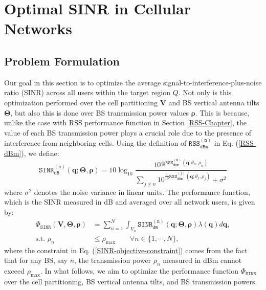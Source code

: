 \section{Optimal SINR in Cellular Networks}\label{SINR-Chapter}


\subsection{Problem Formulation}\label{SINR-Problem-Formulation}

Our goal in this section is to optimize the average signal-to-interference-plus-noise ratio (SINR) across all users within the target region $Q$. Not only is this optimization performed over the cell partitioning $\bm{V}$ and BS vertical antenna tilts $\bm{\Theta}$, but also this is done over BS transmission power values $\bm{\rho}$. This is because, unlike the case with RSS performance function in Section \ref{RSS-Chapter}, the value of each BS transmission power plays a crucial role due to the presence of interference from neighboring cells. Using the definition of $\mathtt{RSS_{dBm}^{(n)}}$ in Eq. (\ref{RSS-dBm}), we define:
\begin{equation}\label{eqn:SINR_dB}
\mathtt{SINR^{(n)}_{dB}} (\bm{q}; \mathbf{\Theta}, \bm{\rho}) = 10 \log_{10} \frac{10^{\frac{1}{10}\mathtt{RSS^{(n)}_{dBm}} (\bm{q}; \theta_n, \rho_n)}}{\sum_{j\neq n}^{} 10^{\frac{1}{10}\mathtt{RSS^{(j)}_{dBm}} (\bm{q}; \theta_j, \rho_j)} + \sigma^2}  
\end{equation}
where $\sigma^2$ denotes the noise variance in linear units. The performance function, which is the SINR measured in dB and averaged over all network users, is given by:
\begin{align}\label{SINR-objective}
    \Phi_{\mathtt{SINR}}(\bm{V}, \mathbf{\Theta}, \bm{\rho}) &=  \sum_{n=1}^{N} \int_{V_n} \mathtt{SINR_{dB}^{(n)}}(\bm{q}; \mathbf{\Theta}, \bm{\rho}) \lambda(\bm{q}) d\bm{q}, \\
    \textrm{s.t. } \rho_n &\leq \rho_{\max} \qquad \forall n\in\{1,\cdots, N\}, \label{SINR-objective-constraint}
\end{align}
where the constraint in Eq. (\ref{SINR-objective-constraint}) comes from the fact that for any BS, say $n$, the transmission power $\rho_n$ measured in dBm cannot exceed $\rho_{\max}$. In what follows, we aim to optimize the performance function $\Phi_{\mathtt{SINR}}$ over the cell partitioning, BS vertical antenna tilts, and BS transmission powers.




